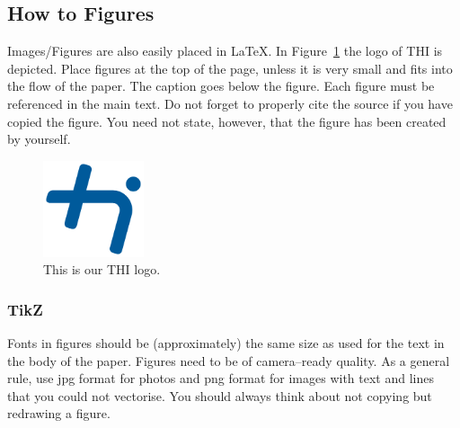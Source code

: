 \subsection{How to Figures}
Images/Figures are also easily placed in \LaTeX. In Figure~\ref{fig:thilogo} the logo of THI is
depicted.  Place figures at the top of the page, unless it is very small and fits into the flow of
the paper. The caption goes below the figure. Each figure must be referenced in the main text. Do
not forget to properly cite the source if you have copied the figure. You need not state, however,
that the figure has been created by yourself.
\begin{figure}[t]
    \centering 
    \includegraphics[width=8em]{thi_logo_b_RGB.png}
    \caption{This is our THI logo.}     %
    \label{fig:thilogo}
\end{figure}

\subsubsection{TikZ} %
Fonts in figures should be (approximately) the same size as used for the text in the body of the
paper. Figures need to be of camera--ready quality. As a general rule, use jpg format for photos and
png format for images with text and lines that you could not vectorise. You should always think
about not copying but redrawing a figure. 


